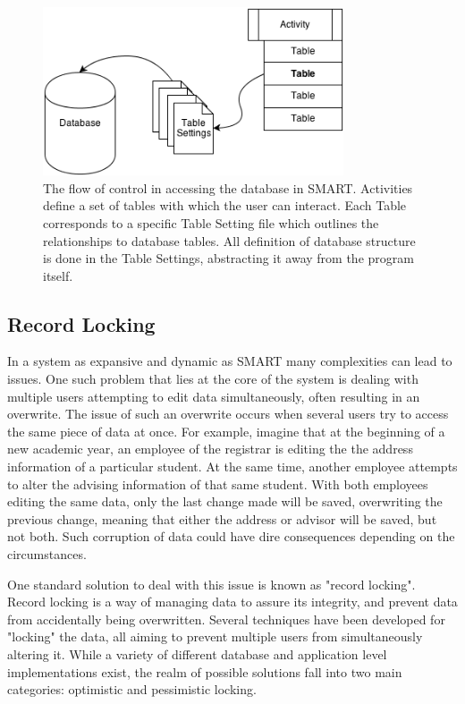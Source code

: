 \documentclass[12pt]{article}
\begin{document}
\begin{figure}[h]
    \vspace{10pt}
    \begin{center}
        \centerline{\includegraphics[width=3.5in]{diagrams/SMARTAccess.png}}
    \end{center}
    \begin{spacing}{1.0}\caption{The flow of control in accessing the database in SMART. Activities define a set of tables with which the user can interact. Each Table corresponds to a specific Table Setting file which outlines the relationships to database tables. All definition of database structure is done in the Table Settings, abstracting it away from the program itself.}\end{spacing}
\end{figure}

\subsection{Record Locking}

In a system as expansive and dynamic as SMART many complexities can lead to issues. One such problem that lies at the core of the system is dealing with multiple users attempting to edit data simultaneously, often resulting in an overwrite. The issue of such an overwrite occurs when several users try to access the same piece of data at once. For example, imagine that at the beginning of a new academic year, an employee of the registrar is editing the the address information of a particular student. At the same time, another employee attempts to alter the advising information of that same student. With both employees editing the same data, only the last change made will be saved, overwriting the previous change, meaning that either the address or advisor will be saved, but not both. Such corruption of data could have dire consequences depending on the circumstances.  

One standard solution to deal with this issue is known as "record locking". Record locking is a way of managing data to assure its integrity, and prevent data from accidentally being overwritten. Several techniques have been developed for "locking" the data, all aiming to prevent multiple users from simultaneously altering it. While a variety of different database and application level implementations exist, the realm of possible solutions fall into two main categories: optimistic and pessimistic locking. 
\end{document}
